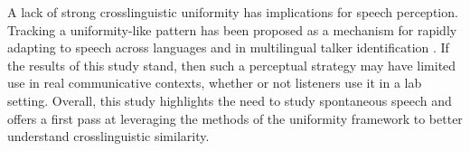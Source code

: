 A lack of strong crosslinguistic uniformity has implications for speech perception. Tracking a uniformity-like pattern has been proposed as a mechanism for rapidly adapting to speech across languages \citep{reinisch_2013_retune} and in multilingual talker identification \cite{orena_2019_identifying}. If the results of this study stand, then such a perceptual strategy may have limited use in real communicative contexts, whether or not listeners use it in a lab setting. Overall, this study highlights the need to study spontaneous speech and offers a first pass at leveraging the methods of the uniformity framework to better understand crosslinguistic similarity.

\endinput %






